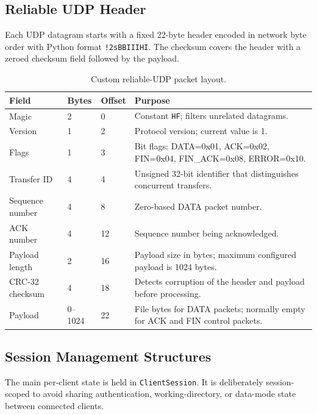 \documentclass[11pt,a4paper]{article}
\newcommand{\code}[1]{\texttt{#1}}
\begin{document}
\subsection{Reliable UDP Header}

Each UDP datagram starts with a fixed 22-byte header encoded in network byte order with Python format \code{!2sBBIIIHI}. The checksum covers the header with a zeroed checksum field followed by the payload.

\begin{table}[htbp]
\centering
\begin{tabularx}{\textwidth}{@{}P{24mm}P{19mm}P{19mm}Y@{}}
\toprule
\textbf{Field} & \textbf{Bytes} & \textbf{Offset} & \textbf{Purpose} \\
\midrule
Magic & 2 & 0 & Constant \code{HF}; filters unrelated datagrams. \\
Version & 1 & 2 & Protocol version; current value is 1. \\
Flags & 1 & 3 & Bit flags: DATA=0x01, ACK=0x02, FIN=0x04, FIN\_ACK=0x08, ERROR=0x10. \\
Transfer ID & 4 & 4 & Unsigned 32-bit identifier that distinguishes concurrent transfers. \\
Sequence number & 4 & 8 & Zero-based DATA packet number. \\
ACK number & 4 & 12 & Sequence number being acknowledged. \\
Payload length & 2 & 16 & Payload size in bytes; maximum configured payload is 1024 bytes. \\
CRC-32 checksum & 4 & 18 & Detects corruption of the header and payload before processing. \\
Payload & 0--1024 & 22 & File bytes for DATA packets; normally empty for ACK and FIN control packets. \\
\bottomrule
\end{tabularx}
\caption{Custom reliable-UDP packet layout.}
\end{table}

\subsection{Session Management Structures}

The main per-client state is held in \code{ClientSession}. It is deliberately session-scoped to avoid sharing authentication, working-directory, or data-mode state between connected clients.
\end{document}
